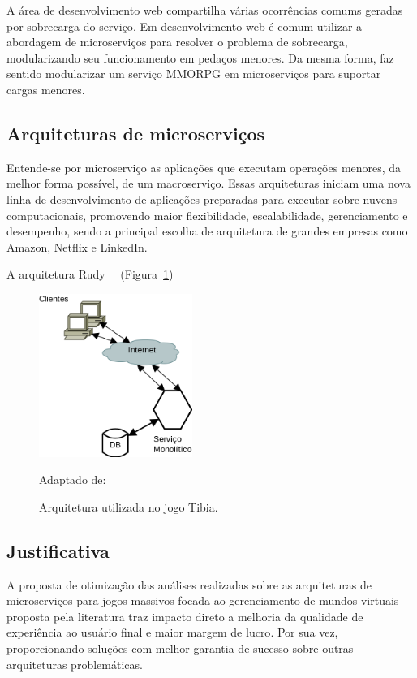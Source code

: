 A área de desenvolvimento web compartilha várias ocorrências comums geradas por sobrecarga do serviço\cite{7830692}.
%
Em desenvolvimento web é comum utilizar a abordagem de microserviços para resolver o problema de sobrecarga, modularizando seu funcionamento em pedaços menores.
Da mesma forma, faz sentido modularizar um serviço \ac{MMORPG} em microserviços para suportar cargas menores.

\subsection{Arquiteturas de microserviços}

Entende-se por microserviço as aplicações que executam operações menores, da melhor forma possível, de um macroserviço\cite{stephenclarkewillson2017}.
%
Essas arquiteturas iniciam uma nova linha de desenvolvimento de aplicações preparadas para executar sobre nuvens computacionais, promovendo maior flexibilidade, escalabilidade, gerenciamento e desempenho, sendo a principal escolha de arquitetura de grandes empresas como Amazon, Netflix e LinkedIn\cite{7830692}\cite{7515686}.


A arquitetura Rudy~\cite{stephenclarkewillson2017}~\cite{matthiasrudy2011} (Figura~\ref{fig:rudy})
\begin{figure}[htb!]
  \caption{Arquitetura utilizada no jogo Tibia.}
  \label{fig:rudy}
  \includegraphics[width=5cm]{arquiteturas/monolitica.png}
  \centering

  Adaptado de:~\cite{stephenclarkewillson2017}
\end{figure}

\subsection{Justificativa}

A proposta de otimização das análises realizadas sobre as arquiteturas de microserviços para jogos massivos focada ao gerenciamento de mundos virtuais proposta pela literatura traz impacto direto a melhoria da qualidade de experiência ao usuário final e maior margem de lucro\cite{1417630}.
%
Por sua vez, proporcionando soluções com melhor garantia de sucesso sobre outras arquiteturas problemáticas.

